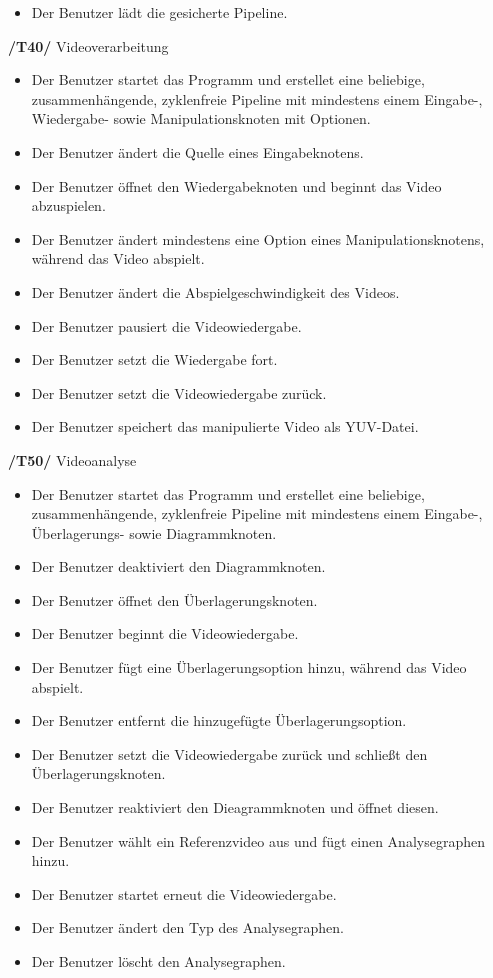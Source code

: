 \begin{description}
\begin{itemize}
			\item Der Benutzer lädt die gesicherte Pipeline.
		\end{itemize}
\newpage
	\item\textbf{/T40/} Videoverarbeitung
		\begin{itemize}
			\item Der Benutzer startet das Programm und erstellet eine beliebige, zusammenhängende, zyklenfreie Pipeline mit mindestens einem Eingabe-, Wiedergabe- sowie 
				Manipulationsknoten mit Optionen.
			\item Der Benutzer ändert die Quelle eines Eingabeknotens.
			\item Der Benutzer öffnet den Wiedergabeknoten und beginnt das Video abzuspielen.
			\item Der Benutzer ändert mindestens eine Option eines Manipulationsknotens, während das Video abspielt.
			\item Der Benutzer ändert die Abspielgeschwindigkeit des Videos.
			\item Der Benutzer pausiert die Videowiedergabe.
			\item Der Benutzer setzt die Wiedergabe fort.
			\item Der Benutzer setzt die Videowiedergabe zurück.
			\item Der Benutzer speichert das manipulierte Video als YUV-Datei.
		\end{itemize}
	\item\textbf{/T50/} Videoanalyse
		\begin{itemize}
			\item Der Benutzer startet das Programm und erstellet eine beliebige, zusammenhängende, zyklenfreie Pipeline mit mindestens einem Eingabe-, Überlagerungs- sowie 
				Diagrammknoten.
			\item Der Benutzer deaktiviert den Diagrammknoten.
			\item Der Benutzer öffnet den Überlagerungsknoten.
			\item Der Benutzer beginnt die Videowiedergabe.
			\item Der Benutzer fügt eine Überlagerungsoption hinzu, während das Video abspielt.
			\item Der Benutzer entfernt die hinzugefügte Überlagerungsoption.
			\item Der Benutzer setzt die Videowiedergabe zurück und schließt den Überlagerungsknoten.
			\item Der Benutzer reaktiviert den Dieagrammknoten und öffnet diesen.
			\item Der Benutzer wählt ein Referenzvideo aus und fügt einen Analysegraphen hinzu.
			\item Der Benutzer startet erneut die Videowiedergabe.
			\item Der Benutzer ändert den Typ des Analysegraphen.
			\item Der Benutzer löscht den Analysegraphen.
		\end{itemize}
\end{description}

